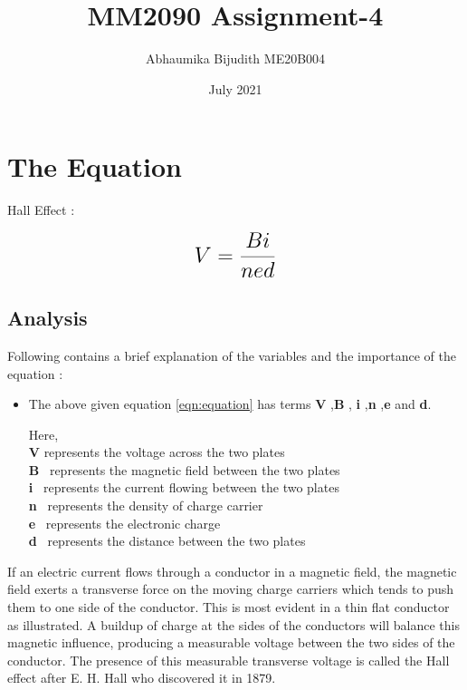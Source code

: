 \documentclass[a4paper, 12pt]{article}
\begin{document}
\title{MM2090 Assignment-4}
\author{Abhaumika Bijudith ME20B004}
\date{July 2021}
\maketitle

\section{The Equation}



Hall Effect  :  

\begin{equation}
 {\LARGE{\textbf{$V =\frac{Bi}{{ned}}$}}}
 \label{eqn:equation}
\end{equation}


\subsection{Analysis}
Following contains a brief explanation of the variables and the importance of the equation :
\begin{itemize}

  \item {\normalsize {The above given equation \ref{eqn:equation} has terms \textbf{V} ,\textbf{B} , \textbf{i} ,\textbf{n} ,\textbf{e} and  \textbf{d}.}}

{\normalsize { Here,}}\\
{\normalsize {\textbf{V} represents the voltage across the two plates }}\\
{\normalsize {\textbf{B} \  represents the magnetic field between the two plates}}\\
{\normalsize {\textbf{i} \  represents the current flowing between the two plates}}\\
{\normalsize {\textbf{n} \  represents the density of charge carrier}}\\
{\normalsize{\textbf{e} \ represents the electronic charge}}\\
{\normalsize{\textbf{d} \ represents the distance between the two plates}}
\end{itemize}



If an electric current flows through a conductor in a magnetic field, the magnetic field exerts a transverse force on the moving charge carriers which tends to push them to one side of the conductor. This is most evident in a thin flat conductor as illustrated. A buildup of charge at the sides of the conductors will balance this magnetic influence, producing a measurable voltage between the two sides of the conductor. The presence of this measurable transverse voltage is called the Hall effect after E. H. Hall who discovered it in 1879.
\end{document}
